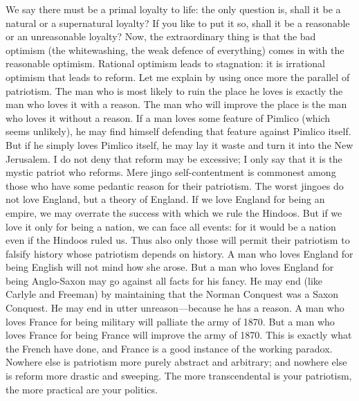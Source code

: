 We say there must be a primal loyalty to life: the only question is, shall it be a natural or a supernatural loyalty? If you like to put it so, shall it be a reasonable or an unreasonable loyalty? Now, the extraordinary thing is that the bad optimism (the whitewashing, the weak defence of everything) comes in with the reasonable optimism. Rational optimism leads to stagnation: it is irrational optimism that leads to reform. Let me explain by using once more the parallel of patriotism. The man who is most likely to ruin the place he loves is exactly the man who loves it with a reason. The man who will improve the place is the man who loves it without a reason. If a man loves some feature of Pimlico (which seems unlikely), he may find himself defending that feature against Pimlico itself. But if he simply loves Pimlico itself, he may lay it waste and turn it into the New Jerusalem. I do not deny that reform may be excessive; I only say that it is the mystic patriot who reforms. Mere jingo self-contentment is commonest among those who have some pedantic reason for their patriotism. The worst jingoes do not love England, but a theory of England. If we love England for being an empire, we may overrate the success with which we rule the Hindoos. But if we love it only for being a nation, we can face all events: for it would be a nation even if the Hindoos ruled us. Thus also only those will permit their patriotism to falsify history whose patriotism depends on history. A man who loves England for being English will not mind how she arose. But a man who loves England for being Anglo-Saxon may go against all facts for his fancy. He may end (like Carlyle and Freeman) by maintaining that the Norman Conquest was a Saxon Conquest. He may end in utter unreason—because he has a reason. A man who loves France for being military will palliate the army of 1870. But a man who loves France for being France will improve the army of 1870. This is exactly what the French have done, and France is a good instance of the working paradox. Nowhere else is patriotism more purely abstract and arbitrary; and nowhere else is reform more drastic and sweeping. The more transcendental is your patriotism, the more practical are your politics.

